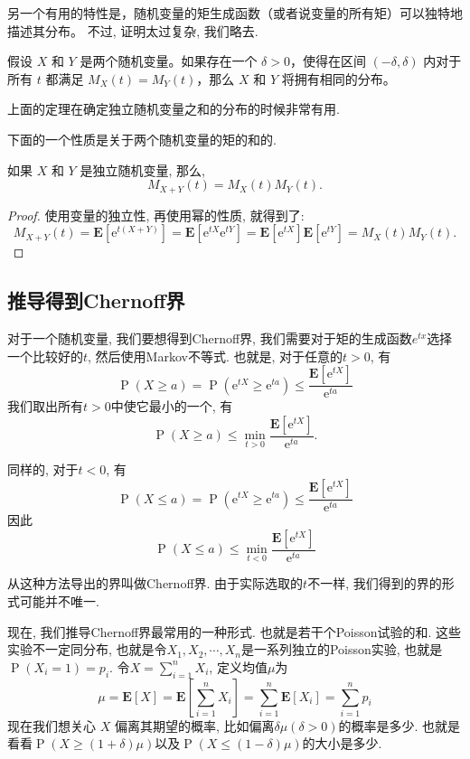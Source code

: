 另一个有用的特性是，随机变量的矩生成函数（或者说变量的所有矩）可以独特地描述其分布。
不过, 证明太过复杂, 我们略去. 

\begin{theorem}
假设 $X$ 和 $Y$ 是两个随机变量。如果存在一个 $\delta > 0$，使得在区间 $(-\delta, \delta)$ 内对于所有 $t$ 都满足
$M_X(t) = M_Y(t)$，那么 $X$ 和 $Y$ 将拥有相同的分布。

\end{theorem}

上面的定理在确定独立随机变量之和的分布的时候非常有用. 

下面的一个性质是关于两个随机变量的矩的和的. 
\begin{theorem}
    如果 $X$ 和 $Y$ 是独立随机变量, 那么, $$M_{X+Y}(t)=M_X(t) M_Y(t).$$
\end{theorem}

\begin{proof}
    使用变量的独立性, 再使用幂的性质, 就得到了:$$M_{X+Y}(t)=\mathbf{E}\left[\mathrm{e}^{t(X+Y)}\right]=\mathbf{E}\left[\mathrm{e}^{t X} \mathrm{e}^{t Y}\right]=\mathbf{E}\left[\mathrm{e}^{t X}\right] \mathbf{E}\left[\mathrm{e}^{t Y}\right]=M_X(t) M_Y(t).$$
\end{proof}

\subsection{推导得到Chernoff界}

对于一个随机变量, 我们要想得到Chernoff界, 我们需要对于矩的生成函数$e^{tx}$选择一个比较好的$t$, 然后使用Markov不等式. 也就是, 对于任意的$t>0$, 有$$\operatorname{P}(X \geq a)=\operatorname{P}\left(\mathrm{e}^{t X} \geq \mathrm{e}^{t a}\right) \leq \frac{\mathbf{E}\left[\mathrm{e}^{t X}\right]}{\mathrm{e}^{t a}}$$我们取出所有$t>0$中使它最小的一个, 有$$
\operatorname{P}(X \geq a) \leq \min _{t>0} \frac{\mathbf{E}\left[\mathrm{e}^{t X}\right]}{\mathrm{e}^{t a}}.$$

同样的, 对于$t<0$, 有
$$
\operatorname{P}(X \leq a)=\operatorname{P}\left(\mathrm{e}^{t X} \geq \mathrm{e}^{t a}\right) \leq \frac{\mathbf{E}\left[\mathrm{e}^{t X}\right]}{\mathrm{e}^{t a}}
$$
因此
$$
\operatorname{P}(X \leq a) \leq \min _{t<0} \frac{\mathbf{E}\left[\mathrm{e}^{t X}\right]}{\mathrm{e}^{t a}}
$$

从这种方法导出的界叫做Chernoff界. 由于实际选取的$t$不一样, 我们得到的界的形式可能并不唯一. 

现在, 我们推导Chernoff界最常用的一种形式. 也就是若干个Poisson试验的和. 这些实验不一定同分布,  也就是令$X_1, X_2, \cdots, X_n$是一系列独立的Poisson实验, 也就是$\operatorname{P}\left(X_i=1\right)=p_i$. 令$X=\sum_{i=1}^n X_i$, 定义均值$\mu$为
$$
\mu=\mathbf{E}[X]=\mathbf{E}\left[\sum_{i=1}^n X_i\right]=\sum_{i=1}^n \mathbf{E}\left[X_i\right]=\sum_{i=1}^n p_i
$$
现在我们想关心 $X$ 偏离其期望的概率, 比如偏离$\delta \mu(\delta>0)$的概率是多少.  也就是看看$\operatorname{P}(X \geq(1+\delta) \mu)$以及$\operatorname{P}(X \leq(1-\delta) \mu)$的大小是多少.

